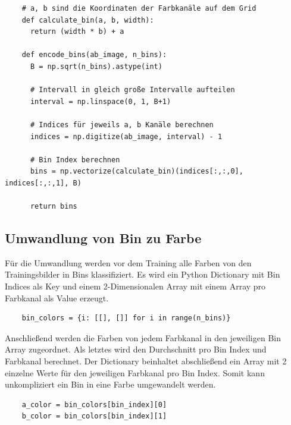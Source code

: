 \begin{listing}[H]
  \begin{verbatim}
    # a, b sind die Koordinaten der Farbkanäle auf dem Grid
    def calculate_bin(a, b, width):
      return (width * b) + a
  
    def encode_bins(ab_image, n_bins):
      B = np.sqrt(n_bins).astype(int)
  
      # Intervall in gleich große Intervalle aufteilen
      interval = np.linspace(0, 1, B+1)
  
      # Indices für jeweils a, b Kanäle berechnen
      indices = np.digitize(ab_image, interval) - 1
  
      # Bin Index berechnen
      bins = np.vectorize(calculate_bin)(indices[:,:,0], indices[:,:,1], B)
  
      return bins
  \end{verbatim}
\end{listing}

\subsection{Umwandlung von Bin zu Farbe}
Für die Umwandlung werden vor dem Training alle Farben von den Trainingsbilder in Bins klassifiziert. Es wird ein Python Dictionary mit Bin
Indices als Key und einem 2-Dimensionalen Array mit einem Array pro Farbkanal als Value erzeugt.

\begin{listing}[H]
  \begin{verbatim}
    bin_colors = {i: [[], []] for i in range(n_bins)}
  \end{verbatim}
\end{listing}

Anschließend werden die Farben von jedem Farbkanal in den jeweiligen Bin Array zugeordnet. Als letztes wird den Durchschnitt pro Bin Index
und Farbkanal berechnet. Der Dictionary beinhaltet abschließend ein Array mit 2 einzelne Werte für den jeweiligen Farbkanal pro Bin Index.
Somit kann unkompliziert ein Bin in eine Farbe umgewandelt werden.

\begin{listing}[H]
  \begin{verbatim}
    a_color = bin_colors[bin_index][0]
    b_color = bin_colors[bin_index][1]
  \end{verbatim}
\end{listing}

